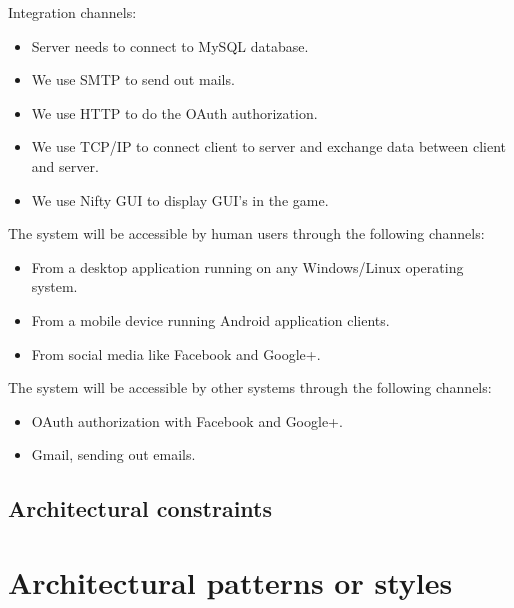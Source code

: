 \documentclass[letterpaper]{article}
\begin{document}
				\hspace{5mm}Integration channels:
					\begin{itemize}
						\item Server needs to connect to MySQL database.
						\item We use SMTP to send out mails.
						\item We use HTTP to do the OAuth authorization.
						\item We use TCP/IP to connect client to server and exchange data between client and server.
						\item We use Nifty GUI to display GUI's in the game.
					\end{itemize}
				
				\vspace{0.1in}				
				
				The system will be accessible by human users through the following channels:
				\begin{itemize}
					\item From a desktop application running on any Windows/Linux operating system.
					\item From a mobile device running Android application clients.
					\item From social media like Facebook and Google+.
				\end{itemize}
				
				The system will be accessible by other systems through the following channels:
				\begin{itemize}
					\item OAuth authorization with Facebook and Google+.
					\item Gmail, sending out emails.
				\end{itemize}
				
			\vspace{0.2in}
			\subsection*{ Architectural constraints }
			\vspace{0.1in}
			
			
			
		\vspace{0.2in}
		\section*{ Architectural patterns or styles }
		\vspace{0.1in}
			
\end{document}
